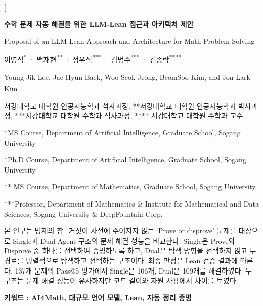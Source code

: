 \documentclass[a4paper,9pt,twocolumn]{extarticle}
\begin{document}
\twocolumn[\begin{@twocolumnfalse}
\begin{center}
{\sffamily\fontsize{16}{20.8}\selectfont\bfseries 수학 문제 자동 해결을 위한 LLM-Lean 접근과 아키텍처 제안}\par\vspace{5pt}
{\sffamily\fontsize{12}{15.6}\selectfont Proposal of an LLM-Lean Approach and Architecture for Math Problem Solving}\par\vspace{8pt}
{\sffamily\fontsize{10}{13}\selectfont 이영직\textsuperscript{*} · 백재현\textsuperscript{**} · 정우석\textsuperscript{***} · 김범수\textsuperscript{***} · 김종락\textsuperscript{****}\textsuperscript{\dag}}\par
{\fontsize{10}{13}\selectfont Young Jik Lee, Jae-Hyun Baek, Woo-Seok Jeong, BeomSoo Kim, and Jon-Lark Kim\textsuperscript{\dag}}\par\vspace{5pt}
{\fontsize{10}{13}\selectfont *서강대학교 대학원 인공지능학과 석사과정, **서강대학교 대학원 인공지능학과 박사과정, ***서강대학교 대학원 수학과  석사과정, **** 서강대학교 대학원 수학과  교수\par
*MS Course, Department of Artificial Intelligence, Graduate School, Sogang University\par**Ph.D Course, Department of Artificial Intelligence, Graduate School, Sogang University\par*** MS Course, Department of Mathematics, Graduate School, Sogang University\par****Professor, Department of Mathematics \& Institute for Mathematical and Data Sciences, Sogang University \& DeepFountain Corp.}
\end{center}
\vspace{5pt}
\begingroup\fontsize{8.5}{11.05}\selectfont
{}\par
본 연구는 명제의 참·거짓이 사전에 주어지지 않는 ‘Prove or disprove’ 문제를 대상으로 Single과 Dual Agent 구조의 문제 해결 성능을 비교한다. Single은 Prove와 Disprove 중 하나를 선택하여 증명하도록 하고, Dual은 탐색 방향을 선택하지 않고 두 경로를 병렬적으로 탐색하고 선택하는 구조이다. 최종 판정은 Lean 검증 결과에 따른다. 137개 문제의 Pass@5 평가에서 Single은 106개, Dual은 109개를 해결하였다. 두 구조는 문제 해결 성능이 유사하지만 코드 길이와 자원 사용에서 차이를 보였다.
\par\noindent\textbf{키워드 : AI4Math, 대규모 언어 모델, Lean, 자동 정리 증명}

\end{@twocolumnfalse}
\end{document}
